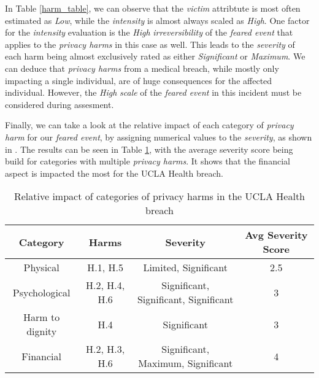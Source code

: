 In Table \ref{harm_table}, we can observe that the \textit{victim} attribtute is most often estimated as \textit{Low}, while the \textit{intensity} is almost always scaled as \textit{High}. One factor for the \textit{intensity} evaluation is the \textit{High} \textit{irreversibility} of the \textit{feared event} that applies to the \textit{privacy harms} in this case as well. This leads to the \textit{severity} of each harm being almost exclusively rated as either \textit{Significant} or \textit{Maximum}. We can deduce that \textit{privacy harms} from a medical breach, while mostly only impacting a single individual, are of huge consequences for the affected individual. However, the \textit{High} \textit{scale} of the \textit{feared event} in this incident must be considered during assesment. 

Finally, we can take a look at the relative impact of each category of \textit{privacy harm} for our \textit{feared event}, by assigning numerical values to the \textit{severity}, as shown in \cite{wairimu2022modelling}. The results can be seen in Table \ref{related_categories}, with the average severity score being build for categories with multiple \textit{privacy harms}. It shows that the financial aspect is impacted the most for the UCLA Health breach.  

\begin{table}[h!]
    \centering

    \begin{tabular}{c|c|c|c}
    \hline
        Category & Harms & Severity & Avg Severity Score \\
    \hline
        Physical & H.1, H.5 & Limited, Significant & 2.5 \\
        Psychological & H.2, H.4, H.6 & Significant, Significant, Significant & 3 \\
        Harm to dignity & H.4 & Significant & 3 \\
        Financial & H.2, H.3, H.6 & Significant, Maximum, Significant & 4 \\
    \hline
    \end{tabular}

    \caption{Relative impact of categories of privacy harms in the UCLA Health breach}
    \label{related_categories}
\end{table}
